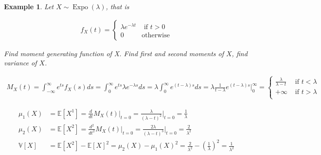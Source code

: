 \documentclass[10pt]{article}
\newtheorem*{example}{Example}
\begin{document}
\begin{example} Let $X\sim \operatorname{Expo}(\lambda)$, that is

\begin{align}
f_X(t)=
\begin{cases}
\lambda e^{-\lambda t} & \mbox{ if } t>0\\
0 & \mbox{otherwise}
\end{cases}
\end{align}

Find moment generating function of X. Find first and second moments of $X$, find variance of $X$.

\begin{align}
M_X(t)
=\int_{-\infty}^\infty e^{ts} f_X(s)ds
=\int_{0}^\infty e^{ts} \lambda e^{-\lambda s}ds
=\lambda\int_{0}^\infty e^{(t-\lambda) s}ds
=\lambda\frac{1}{t-\lambda} e^{(t-\lambda) s}\Biggl|_{0}^\infty=\begin{cases}
\frac{\lambda}{\lambda-t}& \mbox{ if } t<\lambda\\
+\infty& \mbox{ if } t>\lambda\\
\end{cases}
\end{align}

\begin{align}
\mu_1(X)
&=\mathbb{E}[X^1]
=\frac{d}{dt}M_X(t)\Biggl|_{t=0}
=\frac{\lambda}{(\lambda-t)^2}\Biggl|_{t=0}
=\frac{1}{\lambda}\\
\mu_2(X)
&=\mathbb{E}[X^2]
=\frac{d^2}{dt^2}M_X(t)\Biggl|_{t=0}
=\frac{2\lambda}{(\lambda-t)^3}\Biggl|_{t=0}
=\frac{2}{\lambda^2}\\
\mathbb{V}[X]
&=\mathbb{E}[X^2]-\mathbb{E}[X]^2
=\mu_2(X)-\mu_1(X)^2
=\frac{2}{\lambda^2}-\left(\frac{1}{\lambda}\right)^2=\frac{1}{\lambda^2}
\end{align}
\end{example}
\end{document}
